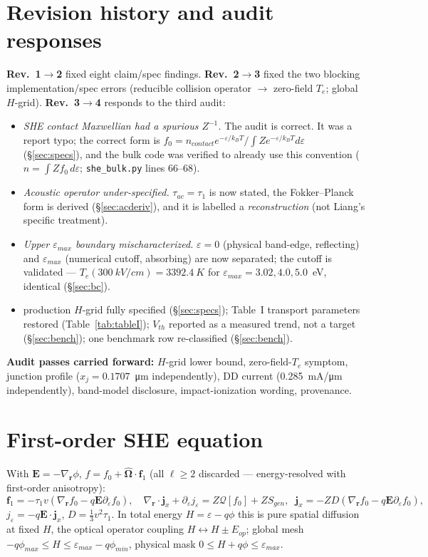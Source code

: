 \documentclass[11pt]{article}
\newcommand{\eps}{\varepsilon}
\newcommand{\vecr}{\mathbf{r}}
\newcommand{\vecE}{\mathbf{E}}
\newcommand{\vecj}{\mathbf{j}}
\newcommand{\Om}{\hat{\boldsymbol{\Omega}}}
\newcommand{\gradr}{\nabla_{\!\vecr}}
\begin{document}
\section{Revision history and audit responses}\label{sec:audit}
\textbf{Rev.\ 1$\to$2} fixed eight claim/spec findings. \textbf{Rev.\ 2$\to$3} fixed the two
blocking implementation/spec errors (reducible collision operator $\to$ zero-field $T_e$;
global $H$-grid). \textbf{Rev.\ 3$\to$4} responds to the third audit:
\begin{itemize}[leftmargin=1.5em,itemsep=1pt]
\item[\textbf{B(new)}] \emph{SHE contact Maxwellian had a spurious $Z^{-1}$.} The audit is
correct. It was a report typo; the correct form is $f_0=n_{contact}e^{-\eps/k_BT}/\!\int Z
e^{-\eps/k_BT}d\eps$ (\S\ref{sec:specs}), and the bulk code was verified to already use this
convention ($n=\int Zf_0\,d\eps$; \texttt{she\_bulk.py} lines 66--68).
\item[\textbf{M1}] \emph{Acoustic operator under-specified.} $\tau_{ac}=\tau_1$ is now
stated, the Fokker--Planck form is derived (\S\ref{sec:acderiv}), and it is labelled a
\emph{reconstruction} (not Liang's specific treatment).
\item[\textbf{M2}] \emph{Upper $\eps_{max}$ boundary mischaracterized.} $\eps=0$ (physical
band-edge, reflecting) and $\eps_{max}$ (numerical cutoff, absorbing) are now separated; the
cutoff is validated --- $T_e(\SI{300}{kV/cm})=\SI{3392.4}{K}$ for $\eps_{max}=3.02,4.0,
5.0$~eV, identical (\S\ref{sec:bc}).
\item[\textbf{m3--m5}] production $H$-grid fully specified (\S\ref{sec:specs}); Table~I
transport parameters restored (Table~\ref{tab:tableI}); $V_{th}$ reported as a measured
trend, not a target (\S\ref{sec:bench}); one benchmark row re-classified (\S\ref{sec:bench}).
\end{itemize}
\textbf{Audit passes carried forward:} $H$-grid lower bound, zero-field-$T_e$ symptom,
junction profile ($x_j=0.1707$~\si{\micro\meter} independently), DD current
(\SI{0.285}{mA/\micro\meter} independently), band-model disclosure, impact-ionization
wording, provenance.

\section{First-order SHE equation}\label{sec:derivation}
With $\vecE=-\gradr\phi$, $f=f_0+\Om\cdot\mathbf{f}_1$ (all $\ell\ge2$ discarded ---
energy-resolved with first-order anisotropy):
\begin{equation}
\mathbf{f}_1=-\tau_1 v(\gradr f_0-q\vecE\partial_\eps f_0),\quad
\gradr\!\cdot\vecj_x+\partial_\eps j_\eps=Z\mathcal{Q}[f_0]+ZS_{gen},\;\;
\vecj_x=-ZD(\gradr f_0-q\vecE\partial_\eps f_0),
\end{equation}
$j_\eps=-q\vecE\!\cdot\vecj_x$, $D=\tfrac13 v^2\tau_1$. In total energy $H=\eps-q\phi$ this
is pure spatial diffusion at fixed $H$, the optical operator coupling $H\!\leftrightarrow\!
H\pm E_{op}$; global mesh $-q\phi_{max}\le H\le\eps_{max}-q\phi_{min}$, physical mask
$0\le H+q\phi\le\eps_{max}$.
\end{document}
